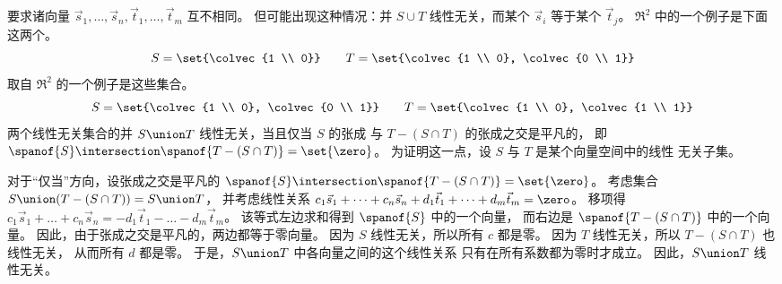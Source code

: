     \begin{answer}
      \begin{exparts}
        \partsitem {}
          要求诸向量
          $\vec{s}_1,\ldots,\vec{s}_n,\vec{t}_1,\ldots,\vec{t}_m$
          互不相同。
          但可能出现这种情况：并 $S\cup T$ 线性无关，而某个 $\vec{s}_i$ 等于某个 $\vec{t}_j$。
        \partsitem \( \Re^2 \) 中的一个例子是下面这两个。
          \begin{equation*}
            S=\set{\colvec{1 \\ 0}}
            \qquad
            T=\set{\colvec{1 \\ 0}, \colvec{0 \\ 1}}
          \end{equation*}
        \partsitem
          取自 \( \Re^2 \) 的一个例子是这些集合。
          \begin{equation*}
            S=\set{\colvec{1 \\ 0}, \colvec{0 \\ 1}}
            \qquad
            T=\set{\colvec{1 \\ 0}, \colvec{1 \\ 1}}
          \end{equation*}
        \partsitem 两个线性无关集合的并 $S\union T$
          线性无关，当且仅当 \( S \) 的张成
          与 \( T-(S\cap T)\) 的张成之交是平凡的，
          即 $\spanof{S}\intersection \spanof{T-(S\cap T)}=\set{\zero}$。
          为证明这一点，设 \( S \) 与 \( T \) 是某个向量空间中的线性
          无关子集。

          对于“仅当”方向，设张成之交是平凡的
          \( \spanof{S}\intersection \spanof{T-(S\cap T)}=\set{\zero} \)。
          考虑集合 $S\union (T-(S\cap T))=S\union T$，
          并考虑线性关系
          $c_1\vec{s}_1+\dots+c_n\vec{s}_n
            +d_1\vec{t}_1+\dots+d_m\vec{t}_m=\zero$。
          移项得
          $c_1\vec{s}_1+\dots+c_n\vec{s}_n=
            -d_1\vec{t}_1-\dots-d_m\vec{t}_m$。
          该等式左边求和得到 $\spanof{S}$ 中的一个向量，
          而右边是 $\spanof{T-(S\cap T)}$ 中的一个向量。
          因此，由于张成之交是平凡的，两边都等于零向量。
          因为 $S$ 线性无关，所以所有 $c$ 都是零。
          因为 $T$ 线性无关，所以 $T-(S\cap T)$ 也线性无关，
          从而所有 $d$ 都是零。
          于是，$S\union T$ 中各向量之间的这个线性关系
          只有在所有系数都为零时才成立。
          因此，$S\union T$ 线性无关。


\end{exparts}
\end{answer}
